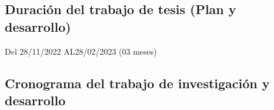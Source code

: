 \documentclass[a4paper, 12pt]{article}
\begin{document}
\subsection{Duración del trabajo de tesis (Plan y desarrollo)}
\hspace*{0.7cm}Del \hspace*{0.2cm}28/11/2022 \hspace*{0.3cm} AL\hspace*{0.2cm}28/02/2023  \hspace*{0.2cm}(03 meses)
 
\subsection{Cronograma del trabajo de investigación y desarrollo}
\end{document}
